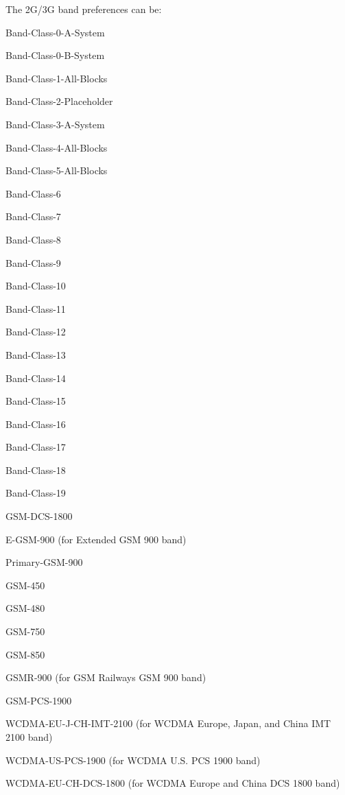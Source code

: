 The 2\+G/3\+G band preferences can be\+:
\begin{DoxyItemize}
\item Band-\/\+Class-\/0-\/\+A-\/\+System
\item Band-\/\+Class-\/0-\/\+B-\/\+System
\item Band-\/\+Class-\/1-\/\+All-\/\+Blocks
\item Band-\/\+Class-\/2-\/\+Placeholder
\item Band-\/\+Class-\/3-\/\+A-\/\+System
\item Band-\/\+Class-\/4-\/\+All-\/\+Blocks
\item Band-\/\+Class-\/5-\/\+All-\/\+Blocks
\item Band-\/\+Class-\/6
\item Band-\/\+Class-\/7
\item Band-\/\+Class-\/8
\item Band-\/\+Class-\/9
\item Band-\/\+Class-\/10
\item Band-\/\+Class-\/11
\item Band-\/\+Class-\/12
\item Band-\/\+Class-\/13
\item Band-\/\+Class-\/14
\item Band-\/\+Class-\/15
\item Band-\/\+Class-\/16
\item Band-\/\+Class-\/17
\item Band-\/\+Class-\/18
\item Band-\/\+Class-\/19
\item G\+S\+M-\/\+D\+C\+S-\/1800
\item E-\/\+G\+S\+M-\/900 (for Extended G\+S\+M 900 band)
\item Primary-\/\+G\+S\+M-\/900
\item G\+S\+M-\/450
\item G\+S\+M-\/480
\item G\+S\+M-\/750
\item G\+S\+M-\/850
\item G\+S\+M\+R-\/900 (for G\+S\+M Railways G\+S\+M 900 band)
\item G\+S\+M-\/\+P\+C\+S-\/1900
\item W\+C\+D\+M\+A-\/\+E\+U-\/\+J-\/\+C\+H-\/\+I\+M\+T-\/2100 (for W\+C\+D\+M\+A Europe, Japan, and China I\+M\+T 2100 band)
\item W\+C\+D\+M\+A-\/\+U\+S-\/\+P\+C\+S-\/1900 (for W\+C\+D\+M\+A U.\+S. P\+C\+S 1900 band)
\item W\+C\+D\+M\+A-\/\+E\+U-\/\+C\+H-\/\+D\+C\+S-\/1800 (for W\+C\+D\+M\+A Europe and China D\+C\+S 1800 band)

\end{DoxyItemize}
